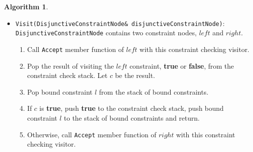 \documentclass[a4paper,oneside,11pt]{book}
\theoremstyle{definition}
\newtheorem{algo}{Algorithm}[section]
\begin{document}
\begin{algo}
\begin{itemize}
\begin{enumerate}
\begin{enumerate}
\begin{enumerate}
\item
Let $t$ be the $i$'th type parameter contained by the \verb|ConceptIdNode|.
\item
Call the \verb|Accept| member function of $t$ with this constraint checker visitor.
\item
If the \emph{resolvedType} is not null:
\begin{itemize}
\item
Add \emph{resolvedType} to the list of type arguments $a$.
\end{itemize}
\end{enumerate}
\item
Compute a 16-byte $conceptId$ using algorithm \ref{computeconceptid} for the concept symbol $s$ and list of type arguments $a$.
\item
Lookup $conceptId$ from the concept repository (section \ref{conceptrepository}).
\item
If found, push \textbf{true} to the constraint check stack.
\item
Otherwise, instantiate concept $s$ with type arguments $a$ using algorithm \ref{instantiateconcept}.
Let $c$ be the instantiated concept.
\item
If $c$ is not null, add $c$ to the concept repository with id $conceptId$, and push \textbf{true} to the constraint check stack.
\item
Otherwise, push \textbf{false} to the constraint check stack.
\end{enumerate}
\end{enumerate}
\item
\verb|Visit(DisjunctiveConstraintNode& disjunctiveConstraintNode)|:\\
\verb|DisjunctiveConstraintNode| contains two constraint nodes, $left$ and $right$.
\begin{enumerate}
\item
Call \verb|Accept| member function of $left$ with this constraint checking visitor.
\item
Pop the result of visiting the $left$ constraint, \textbf{true} or \textbf{false}, from the constraint check stack. Let $c$ be the result.
\item
Pop bound constraint $l$ from the stack of bound constraints.
\item
If $c$ is \textbf{true}, push \textbf{true} to the constraint check stack, push bound constraint $l$ to the stack of bound constraints and return.
\item
Otherwise, call \verb|Accept| member function of $right$ with this constraint checking visitor.

\end{enumerate}
\end{itemize}
\end{algo}
\end{document}
